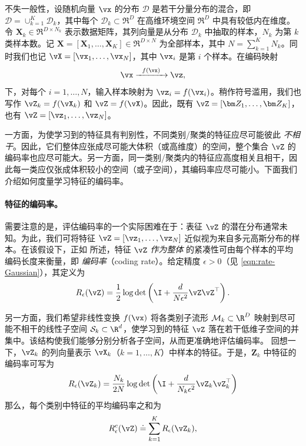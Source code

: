 \documentclass[../../book-main_zh.tex]{subfiles}
\begin{document}
不失一般性，设随机向量 $\vx$ 的分布 $\mathcal D$ 是若干分量分布的混合，即 $\mathcal D = \cup_{k=1}^K \mathcal{D}_k$，其中每个 $\mathcal{D}_k \subset \Re^D$ 在高维环境空间 $\Re^D$ 中具有较低内在维度。令 $\bm X_k \in \Re^{D\times N_k}$ 表示数据矩阵，其列向量是从分布 $\mathcal{D}_k$ 中抽取的样本，$N_k$ 为第 $k$ 类样本数。记 $\bm X=[\bm X_1,\dots,\bm X_K] \in \Re^{D\times N}$ 为全部样本，其中 $N=\sum_{k=1}^K N_k$。同时我们也记 $\vX=[\vx_1,\dots,\vx_N]$，其中 $\vx_i$ 是第 $i$ 个样本。在编码映射
\begin{equation}
    \vx  \xrightarrow{\hspace{2mm} f(\vx)\hspace{2mm}} \vz,
\end{equation}
下，对每个 $i=1,\dots,N$，输入样本映射为 $\vz_i = f(\vx_i)$。稍作符号滥用，我们也写作 $\vZ_k = f(\vX_k)$ 和 $\vZ = f(\vX)$。因此，既有 $\vZ = [\bm Z_1,\dots,\bm Z_K]$，也有 $\vZ = [\vz_1,\dots,\vz_N]$。

一方面，为使学习到的特征具有判别性，不同类别/聚类的特征应尽可能彼此 {\em 不相干}。因此，它们整体应张成尽可能大体积（或高维度）的空间，整个集合 $\vZ$ 的编码率也应尽可能大。另一方面，同一类别/聚类内的特征应高度相关且相干，因此每一类应仅张成体积较小的空间（或子空间），其编码率应尽可能小。下面我们介绍如何度量学习特征的编码率。

\paragraph{特征的编码率。} 需要注意的是，评估编码率的一个实际困难在于：表征 $\vZ$ 的潜在分布通常未知。为此，我们可将特征 $\vZ = [\vz_1, \ldots, \vz_N]$ 近似视为来自多元高斯分布的样本。在该假设下，正如  所述，特征 $\vZ$ {\em 作为整体} 的紧凑性可由每个样本的平均编码长度来衡量，即 {\em 编码率}（coding rate）。给定精度 $\epsilon > 0$（见 \eqref{eqn:rate-Gaussian}），其定义为
\begin{equation}
    R_{\epsilon}(\vZ) = \frac{1}{2}\log\det\left(\I +
    \frac{d}{N\epsilon^{2}}\vZ\vZ^{\top}\right).
    \label{chap4-eqn:coding-length-eval}
\end{equation}

另一方面，我们希望非线性变换 $f(\vx)$ 将各类别子流形 $\mathcal{M}_k \subset \R^D$ 映射到尽可能不相干的线性子空间 $\mathcal{S}_k \subset \R^d$，使学习到的特征 $\vZ$ 落在若干低维子空间的并集中。该结构使我们能够分别分析各子空间，从而更准确地评估编码率。%
回想一下，$\vZ_k$ 的列向量表示 $\vX_k$（$k=1,\dots,K$）中样本的特征。于是，$\bm Z_k$ 中特征的编码率可写为
\begin{align}
    R_{\epsilon}(\vZ_k) = \frac{N_k}{2N}\log\det\left(\I +
    \frac{d}{N_k\epsilon^{2}}\vZ_k\vZ_k^{\top}\right)
\end{align}
那么，每个类别中特征的平均编码率之和为
\begin{equation}
    R_{\epsilon}^c(\vZ) \doteq \sum_{k=1}^K R_{\epsilon}(\vZ_k),
    \label{chap4-eqn:compress-loss-eval}
\end{equation}
\end{document}
